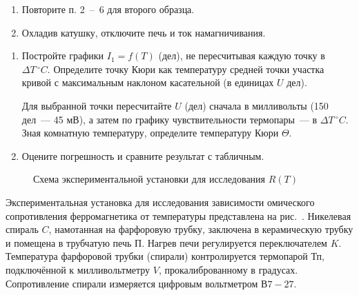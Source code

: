 \begin{lab:task}
\begin{enumerate}
\item
  Повторите п. 2~--~6 для второго образца.
\item
  Охладив катушку, отключите печь и ток намагничивания.
\end{enumerate}
\begin{enumerate}

\item
  Постройте графики $I_1 = f(T)$ (дел), не пересчитывая каждую точку в $\Delta T\,^{\circ} C$. Определите точку Кюри как температуру средней точки участка кривой с максимальным наклоном касательной (в единицах $U$ дел).

Для выбранной точки пересчитайте $U$ (дел) сначала в милливольты (150 дел~--- 45 мВ), а затем по графику чувствительности термопары~--- в  $\Delta T\,^{\circ} C$. Зная комнатную температуру, определите температуру Кюри $\Theta$.


\item
  Оцените погрешность и сравните результат с табличным.
\end{enumerate}

\end{lab:task}


\experiment
 
\begin{figure}[h!]
	\caption{Схема экспериментальной установки для исследования $R(T)$}
\end{figure}
Экспериментальная установка для исследования зависимости омического сопротивления ферромагнетика от температуры представлена на рис.~. Никелевая спираль $C$, намотанная на фарфоровую трубку, заключена в керамическую трубку и помещена в трубчатую печь $\text{П}$. Нагрев печи регулируется переключателем $K$. Температура фарфоровой трубки (спирали) контролируется термопарой $\text{Тп}$, подключённой к милливольтметру $V$, прокалиброванному в градусах. Сопротивление спирали измеряется цифровым вольтметром $\text{В}7 - 27$.


